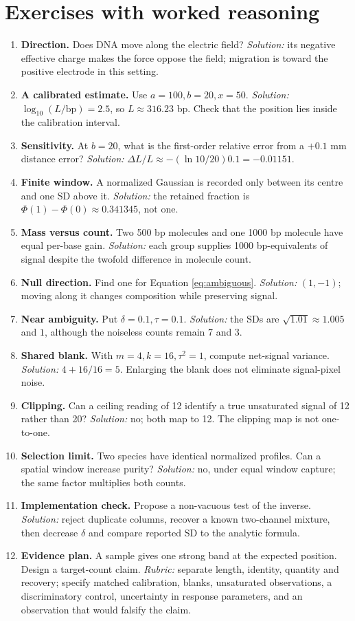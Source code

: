 \section{Exercises with worked reasoning}
\begin{enumerate}
\item \textbf{Direction.} Does DNA move along the electric field? \emph{Solution:} its negative effective charge makes the force oppose the field; migration is toward the positive electrode in this setting.
\item \textbf{A calibrated estimate.} Use $a=100,b=20,x=50$. \emph{Solution:} $\log_{10}(L/\mathrm{bp})=2.5$, so $L\approx316.23$ bp. Check that the position lies inside the calibration interval.
\item \textbf{Sensitivity.} At $b=20$, what is the first-order relative error from a $+0.1$ mm distance error? \emph{Solution:} $\Delta L/L\approx-(\ln10/20)0.1=-0.01151$.
\item \textbf{Finite window.} A normalized Gaussian is recorded only between its centre and one SD above it. \emph{Solution:} the retained fraction is $\Phi(1)-\Phi(0)\approx0.341345$, not one.
\item \textbf{Mass versus count.} Two 500 bp molecules and one 1000 bp molecule have equal per-base gain. \emph{Solution:} each group supplies 1000 bp-equivalents of signal despite the twofold difference in molecule count.
\item \textbf{Null direction.} Find one for Equation \ref{eq:ambiguous}. \emph{Solution:} $(1,-1)$; moving along it changes composition while preserving signal.
\item \textbf{Near ambiguity.} Put $\delta=0.1,\tau=0.1$. \emph{Solution:} the SDs are $\sqrt{1.01}\approx1.005$ and $1$, although the noiseless counts remain 7 and 3.
\item \textbf{Shared blank.} With $m=4,k=16,\tau^2=1$, compute net-signal variance. \emph{Solution:} $4+16/16=5$. Enlarging the blank does not eliminate signal-pixel noise.
\item \textbf{Clipping.} Can a ceiling reading of 12 identify a true unsaturated signal of 12 rather than 20? \emph{Solution:} no; both map to 12. The clipping map is not one-to-one.
\item \textbf{Selection limit.} Two species have identical normalized profiles. Can a spatial window increase purity? \emph{Solution:} no, under equal window capture; the same factor multiplies both counts.
\item \textbf{Implementation check.} Propose a non-vacuous test of the inverse. \emph{Solution:} reject duplicate columns, recover a known two-channel mixture, then decrease $\delta$ and compare reported SD to the analytic formula.
\item \textbf{Evidence plan.} A sample gives one strong band at the expected position. Design a target-count claim. \emph{Rubric:} separate length, identity, quantity and recovery; specify matched calibration, blanks, unsaturated observations, a discriminatory control, uncertainty in response parameters, and an observation that would falsify the claim.
\end{enumerate}

